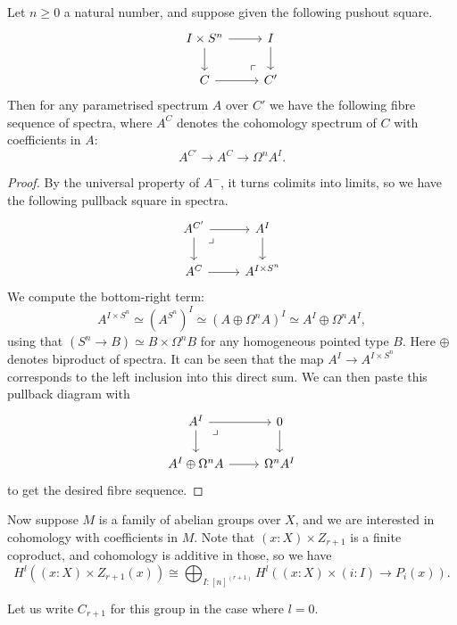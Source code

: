 \begin{lemma}\label{cw-fibre}
Let $n \ge 0$ a natural number, and suppose given the
following pushout square.
\[
\begin{tikzcd}
I \times S^n \arrow[r] \arrow[d]
	& I \arrow[d] \\
	C \arrow[r] &
	C'
	\arrow[ul, phantom, "\ulcorner" , very near start]
\end{tikzcd}
\]
Then for any parametrised spectrum $A$ over $C'$ we have the following fibre
sequence of spectra, where $A^C$ denotes the cohomology spectrum of $C$ with
coefficients in $A$:
\[
	A^{C'} \to A^C \to \Omega^n A^I.
\]
\end{lemma}
\begin{proof}
By the universal property of $A^-$, it turns colimits into limits, so we have the following
pullback square in spectra.
\[
\begin{tikzcd}
A^{C'} \arrow[r] \arrow[d] \arrow[dr, phantom, "\lrcorner" , very near start]
	& A^I \arrow[d] \\
	A^C \arrow[r] &
	A^{I \times S^n}
\end{tikzcd}
\]
We compute the bottom-right term:
\[A^{I \times S^n} \simeq (A^{S^n})^I \simeq (A \oplus \Omega^n A)^I \simeq A^I \oplus \Omega^n A^I,\]
using that $(S^n \to B) \simeq B \times \Omega^n B$ for any homogeneous pointed type $B$.
Here $\oplus$ denotes biproduct of spectra.
It can be seen that the map $A^I \to A^{I \times S^n}$ corresponds to the left inclusion into
this direct sum. We can then paste this pullback diagram with
\[
\begin{tikzcd}
A^I \arrow[r] \arrow[d] \arrow[dr, phantom, "\lrcorner" , very near start]
	& 0 \arrow[d] \\
	A^I \oplus \Omega^n A \arrow[r] &
	\Omega^n A^I
\end{tikzcd}
\]
to get the desired fibre sequence.
\end{proof}

Now suppose $M$ is a family of abelian groups over $X$, and we are interested in
cohomology with coefficients in $M$.
Note that $(x : X) \times Z_{r+1}$ is a finite coproduct, and
cohomology is additive in those, so we have
\[H^l((x : X) \times Z_{r+1}(x))
	\cong
	\bigoplus_{I : [n]^{(r+1)}} H^l((x : X) \times (i : I) \to P_i(x)).\]

Let us write $C_{r+1}$ for this group in the case where $l = 0$.

